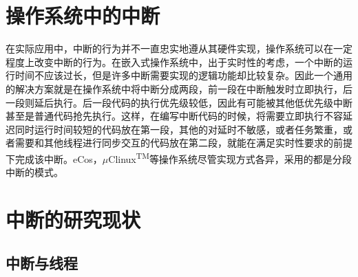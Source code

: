 \section{操作系统中的中断}
在实际应用中，中断的行为并不一直忠实地遵从其硬件实现，操作系统可以在一定程度上改变中断的行为。在嵌入式操作系统中，出于实时性的考虑，一个中断的运行时间不应该过长，但是许多中断需要实现的逻辑功能却比较复杂。因此一个通用的解决方案就是在操作系统中将中断分成两段，前一段在中断触发时立即执行，后一段则延后执行。后一段代码的执行优先级较低，因此有可能被其他低优先级中断甚至是普通代码抢先执行。这样，在编写中断代码的时候，将需要立即执行不容延迟同时运行时间较短的代码放在第一段，其他的对延时不敏感，或者任务繁重，或者需要和其他线程进行同步交互的代码放在第二段，就能在满足实时性要求的前提下完成该中断。eCos，$\mu$Clinux\textsuperscript{TM}等操作系统尽管实现方式各异，采用的都是分段中断的模式。

\section{中断的研究现状}

\subsection{中断与线程}
